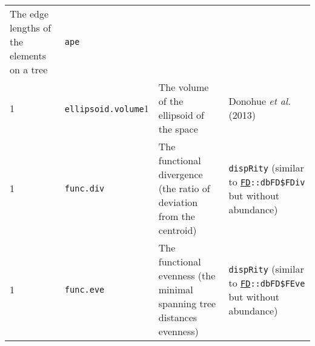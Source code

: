 \documentclass[
]{book}
\begin{document}
\begin{longtable}[]{@{}llll@{}}
\begin{minipage}[t]{0.64\columnwidth}
The edge lengths of the elements on a tree\strut
\end{minipage} & \begin{minipage}[t]{0.10\columnwidth}\raggedright
\texttt{ape}\strut
\end{minipage}\tabularnewline
\begin{minipage}[t]{0.07\columnwidth}\raggedright
1\strut
\end{minipage} & \begin{minipage}[t]{0.07\columnwidth}\raggedright
\texttt{ellipsoid.volume}1\strut
\end{minipage} & \begin{minipage}[t]{0.64\columnwidth}\raggedright
The volume of the ellipsoid of the space\strut
\end{minipage} & \begin{minipage}[t]{0.10\columnwidth}\raggedright
Donohue \emph{et al.} (2013)\strut
\end{minipage}\tabularnewline
\begin{minipage}[t]{0.07\columnwidth}\raggedright
1\strut
\end{minipage} & \begin{minipage}[t]{0.07\columnwidth}\raggedright
\texttt{func.div}\strut
\end{minipage} & \begin{minipage}[t]{0.64\columnwidth}\raggedright
The functional divergence (the ratio of deviation from the centroid)\strut
\end{minipage} & \begin{minipage}[t]{0.10\columnwidth}\raggedright
\texttt{dispRity} (similar to \href{https://cran.r-project.org/web/packages/FD/index.html}{\texttt{FD}}\texttt{::dbFD\$FDiv} but without abundance)\strut
\end{minipage}\tabularnewline
\begin{minipage}[t]{0.07\columnwidth}\raggedright
1\strut
\end{minipage} & \begin{minipage}[t]{0.07\columnwidth}\raggedright
\texttt{func.eve}\strut
\end{minipage} & \begin{minipage}[t]{0.64\columnwidth}\raggedright
The functional evenness (the minimal spanning tree distances evenness)\strut
\end{minipage} & \begin{minipage}[t]{0.10\columnwidth}\raggedright
\texttt{dispRity} (similar to \href{https://cran.r-project.org/web/packages/FD/index.html}{\texttt{FD}}\texttt{::dbFD\$FEve} but without abundance)\strut

\end{minipage}
\end{longtable}
\end{document}
